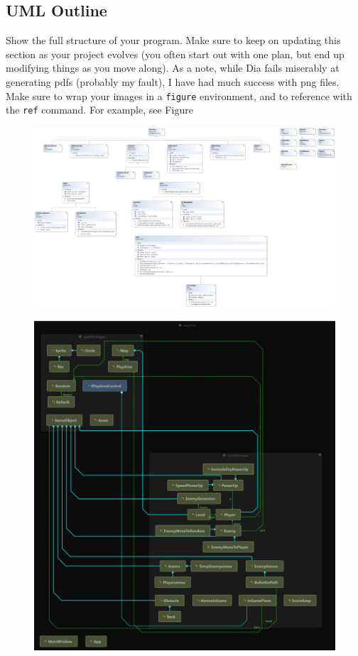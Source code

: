 \documentclass[10pt,conference,onecolumn,compsoc]{IEEEtran}
\begin{document}
\subsection{UML Outline}
Show the full structure of your program.  Make sure to keep on updating this section as your project evolves (you often start out with one plan, but end up modifying things as you move along).  As a note, while Dia fails miserably at generating pdfs (probably my fault), I have had much success with png files.  Make sure to wrap your images in a \texttt{figure} environment, and to reference with the \texttt{ref} command.  For example, see Figure %
\begin{figure}[ht!]
\includegraphics[scale=.25]{ClassDiagram1.png}
\caption{}
\label{UML}
\end{figure}
\begin{figure}[ht!]
\includegraphics[scale=.25]{Dependencies Graph.png}
\caption{}
\label{UML}
\end{figure}
\end{document}
